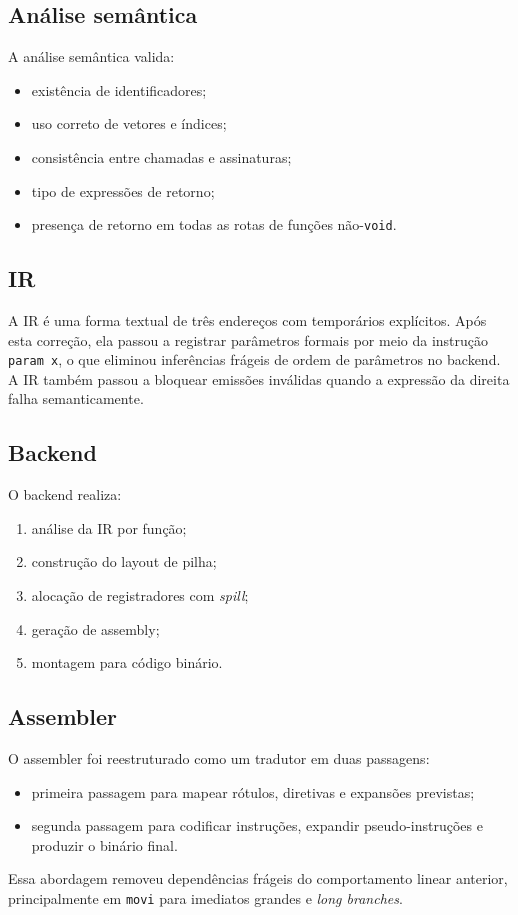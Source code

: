 \documentclass[12pt,a4paper]{article}
\begin{document}
\subsection{Análise semântica}
A análise semântica valida:
\begin{itemize}[leftmargin=1.5em]
    \item existência de identificadores;
    \item uso correto de vetores e índices;
    \item consistência entre chamadas e assinaturas;
    \item tipo de expressões de retorno;
    \item presença de retorno em todas as rotas de funções não-\texttt{void}.
\end{itemize}

\subsection{IR}
A IR é uma forma textual de três endereços com temporários explícitos. Após esta correção, ela passou a registrar parâmetros formais por meio da instrução \texttt{param x}, o que eliminou inferências frágeis de ordem de parâmetros no backend. A IR também passou a bloquear emissões inválidas quando a expressão da direita falha semanticamente.

\subsection{Backend}
O backend realiza:
\begin{enumerate}[leftmargin=1.5em]
    \item análise da IR por função;
    \item construção do layout de pilha;
    \item alocação de registradores com \emph{spill};
    \item geração de assembly;
    \item montagem para código binário.
\end{enumerate}

\subsection{Assembler}
O assembler foi reestruturado como um tradutor em duas passagens:
\begin{itemize}[leftmargin=1.5em]
    \item primeira passagem para mapear rótulos, diretivas e expansões previstas;
    \item segunda passagem para codificar instruções, expandir pseudo-instruções e produzir o binário final.
\end{itemize}
Essa abordagem removeu dependências frágeis do comportamento linear anterior, principalmente em \texttt{movi} para imediatos grandes e \emph{long branches}.
\end{document}
